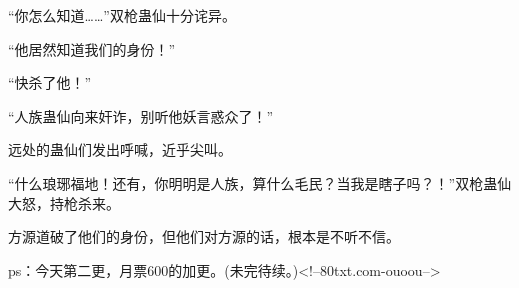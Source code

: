 \begin{this_body}
“你怎么知道……”双枪蛊仙十分诧异。

“他居然知道我们的身份！”

“快杀了他！”

“人族蛊仙向来奸诈，别听他妖言惑众了！”

远处的蛊仙们发出呼喊，近乎尖叫。

“什么琅琊福地！还有，你明明是人族，算什么毛民？当我是瞎子吗？！”双枪蛊仙大怒，持枪杀来。

方源道破了他们的身份，但他们对方源的话，根本是不听不信。

ps：今天第二更，月票600的加更。(未完待续。)<!--80txt.com-ouoou-->

\end{this_body}

